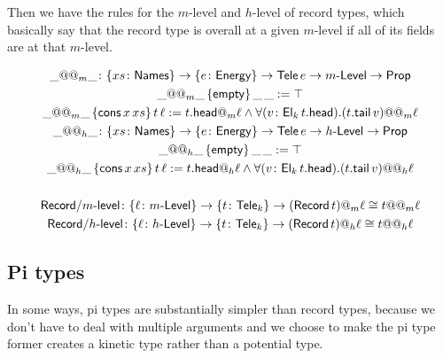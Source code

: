 \documentclass[fleqn,leqno]{article}
\begin{document}
Then we have the rules for the $m$-level and $h$-level of record types, which basically say that the record type is overall at a given $m$-level if all of its fields are at that $m$-level.

\begin{gather}
  \_@@_m\_ \colon \{xs \colon \mathsf{Names}\} \to \{e \colon \mathsf{Energy}\} \to \mathsf{Tele}\,e \to m\text{-}\mathsf{Level} \to \mathsf{Prop} \\
  \_@@_m\_\,\{\mathsf{empty}\}\,\_\,\_ := \top \\
  \_@@_m\_\,\{\mathsf{cons}\,x\,xs\}\,t\,\ell := t.\mathsf{head}@_m\ell \wedge \forall (v \colon \mathsf{El}_k\,t.\mathsf{head}). (t.\mathsf{tail}\,v)@@_m\ell \\
  \_@@_h\_ \colon \{xs \colon \mathsf{Names}\} \to \{e \colon \mathsf{Energy}\} \to \mathsf{Tele}\,e \to h\text{-}\mathsf{Level} \to \mathsf{Prop} \\
  \_@@_h\_\,\{\mathsf{empty}\}\,\_\,\_ := \top \\
  \_@@_h\_\,\{\mathsf{cons}\,x\,xs\}\,t\,\ell := t.\mathsf{head}@_h\ell \wedge \forall (v \colon \mathsf{El}_k\,t.\mathsf{head}). (t.\mathsf{tail}\,v)@@_h\ell \\
  \\
  \mathsf{Record}/m\text{-}\mathsf{level} \colon \{\ell \colon m\text{-}\mathsf{Level}\} \to \{t \colon \mathsf{Tele}_k\} \to (\mathsf{Record}\,t)@_m\ell \cong t@@_m\ell \\
  \mathsf{Record}/h\text{-}\mathsf{level} \colon \{\ell \colon h\text{-}\mathsf{Level}\} \to \{t \colon \mathsf{Tele}_k\} \to (\mathsf{Record}\,t)@_h\ell \cong t@@_h\ell
\end{gather}

\subsection{Pi types}

In some ways, pi types are substantially simpler than record types, because we don't have to deal with multiple arguments and we choose to make the pi type former creates a kinetic type rather than a potential type.
\end{document}
